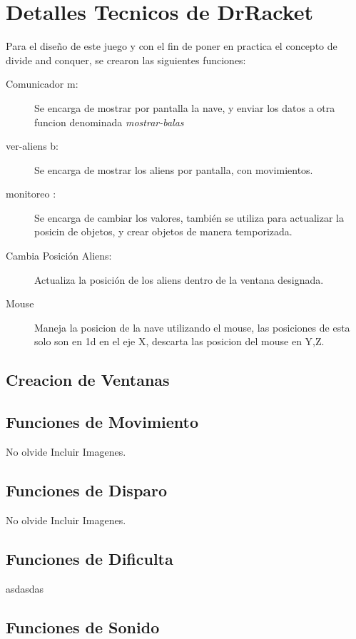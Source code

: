 \documentclass[a4paper]{article}
\begin{document}
\section{Detalles Tecnicos de  DrRacket \label{Funciones}}
Para el diseño de este juego y con el fin de poner en practica el concepto de divide and conquer, se crearon las 
siguientes funciones:
\begin{description}
    \item[Comunicador m:] Se encarga de mostrar por pantalla la nave, y enviar los datos a otra funcion denominada \textit{mostrar-balas}
    \item[ver-aliens b:] Se encarga de mostrar los aliens por pantalla, con movimientos.
    \item[monitoreo :]Se encarga de cambiar los valores, también se utiliza para actualizar la posicin de objetos, y crear objetos de manera temporizada. 
    \item[Cambia Posición Aliens:]Actualiza la posición de los aliens dentro de la ventana designada.
    \item[Mouse] Maneja la posicion de la nave utilizando el mouse, las posiciones de esta solo son en 1d 
        en el eje X, descarta las posicion del mouse en Y,Z.
\end{description}

\subsection{Creacion de Ventanas}

\subsection{Funciones de Movimiento}
No olvide Incluir Imagenes.

\subsection{Funciones de Disparo}
No olvide Incluir Imagenes.
\subsection{Funciones de Dificulta}
asdasdas
\subsection{Funciones de Sonido}
\end{document}
